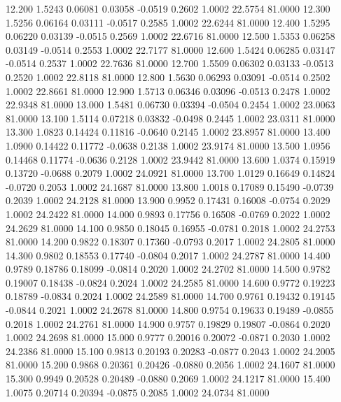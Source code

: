   12.200   1.5243   0.06081   0.03058  -0.0519   0.2602   1.0002  22.5754  81.0000
  12.300   1.5256   0.06164   0.03111  -0.0517   0.2585   1.0002  22.6244  81.0000
  12.400   1.5295   0.06220   0.03139  -0.0515   0.2569   1.0002  22.6716  81.0000
  12.500   1.5353   0.06258   0.03149  -0.0514   0.2553   1.0002  22.7177  81.0000
  12.600   1.5424   0.06285   0.03147  -0.0514   0.2537   1.0002  22.7636  81.0000
  12.700   1.5509   0.06302   0.03133  -0.0513   0.2520   1.0002  22.8118  81.0000
  12.800   1.5630   0.06293   0.03091  -0.0514   0.2502   1.0002  22.8661  81.0000
  12.900   1.5713   0.06346   0.03096  -0.0513   0.2478   1.0002  22.9348  81.0000
  13.000   1.5481   0.06730   0.03394  -0.0504   0.2454   1.0002  23.0063  81.0000
  13.100   1.5114   0.07218   0.03832  -0.0498   0.2445   1.0002  23.0311  81.0000
  13.300   1.0823   0.14424   0.11816  -0.0640   0.2145   1.0002  23.8957  81.0000
  13.400   1.0900   0.14422   0.11772  -0.0638   0.2138   1.0002  23.9174  81.0000
  13.500   1.0956   0.14468   0.11774  -0.0636   0.2128   1.0002  23.9442  81.0000
  13.600   1.0374   0.15919   0.13720  -0.0688   0.2079   1.0002  24.0921  81.0000
  13.700   1.0129   0.16649   0.14824  -0.0720   0.2053   1.0002  24.1687  81.0000
  13.800   1.0018   0.17089   0.15490  -0.0739   0.2039   1.0002  24.2128  81.0000
  13.900   0.9952   0.17431   0.16008  -0.0754   0.2029   1.0002  24.2422  81.0000
  14.000   0.9893   0.17756   0.16508  -0.0769   0.2022   1.0002  24.2629  81.0000
  14.100   0.9850   0.18045   0.16955  -0.0781   0.2018   1.0002  24.2753  81.0000
  14.200   0.9822   0.18307   0.17360  -0.0793   0.2017   1.0002  24.2805  81.0000
  14.300   0.9802   0.18553   0.17740  -0.0804   0.2017   1.0002  24.2787  81.0000
  14.400   0.9789   0.18786   0.18099  -0.0814   0.2020   1.0002  24.2702  81.0000
  14.500   0.9782   0.19007   0.18438  -0.0824   0.2024   1.0002  24.2585  81.0000
  14.600   0.9772   0.19223   0.18789  -0.0834   0.2024   1.0002  24.2589  81.0000
  14.700   0.9761   0.19432   0.19145  -0.0844   0.2021   1.0002  24.2678  81.0000
  14.800   0.9754   0.19633   0.19489  -0.0855   0.2018   1.0002  24.2761  81.0000
  14.900   0.9757   0.19829   0.19807  -0.0864   0.2020   1.0002  24.2698  81.0000
  15.000   0.9777   0.20016   0.20072  -0.0871   0.2030   1.0002  24.2386  81.0000
  15.100   0.9813   0.20193   0.20283  -0.0877   0.2043   1.0002  24.2005  81.0000
  15.200   0.9868   0.20361   0.20426  -0.0880   0.2056   1.0002  24.1607  81.0000
  15.300   0.9949   0.20528   0.20489  -0.0880   0.2069   1.0002  24.1217  81.0000
  15.400   1.0075   0.20714   0.20394  -0.0875   0.2085   1.0002  24.0734  81.0000
